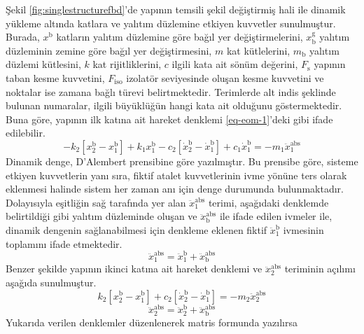 Şekil \ref{fig:singlestructurefbd}'de yapının temsili şekil değiştirmiş
hali ile dinamik yükleme altında katlara ve yalıtım düzlemine etkiyen
kuvvetler sunulmuştur. Burada, $x^{\text{b}}$ katların yalıtım düzlemine
göre bağıl yer değiştirmelerini, $x_{\text{b}}^{\text{g}}$ yalıtım
düzleminin zemine göre bağıl yer değiştirmesini, $m$ kat kütlelerini,
$m_{\text{b}}$ yalıtım düzlemi kütlesini, $k$ kat rijitliklerini,
$c$ ilgili kata ait sönüm değerini, $F_{\text{s}}$ yapının taban
kesme kuvvetini, $F_{\text{iso}}$ izolatör seviyesinde oluşan kesme
kuvvetini ve noktalar ise zamana bağlı türevi belirtmektedir. Terimlerde
alt indis şeklinde bulunan numaralar, ilgili büyüklüğün hangi kata
ait olduğunu göstermektedir. Buna göre, yapının ilk katına ait hareket
denklemi \ref{eq-eom-1}'deki gibi ifade edilebilir. 
\begin{equation}
-k_{2}\left[x_{2}^{\text{b}}-x_{1}^{\text{b}}\right]+k_{1}x_{1}^{\text{b}}-c_{2}\left[\dot{x}_{2}^{\text{b}}-\dot{x}_{1}^{\text{b}}\right]+c_{1}\dot{x}_{1}^{\text{b}}=-m_{1}\ddot{x}_{1}^{\text{abs}}\label{eq-eom-1}
\end{equation}
Dinamik denge, D'Alembert prensibine göre yazılmıştır. Bu prensibe
göre, sisteme etkiyen kuvvetlerin yanı sıra, fiktif atalet kuvvetlerinin
ivme yönüne ters olarak eklenmesi halinde sistem her zaman anı için
denge durumunda bulunmaktadır. Dolayısıyla eşitliğin sağ tarafında
yer alan $\ddot{x}_{1}^{\text{abs}}$ terimi, aşağıdaki denklemde
belirtildiği gibi yalıtım düzleminde oluşan ve $\ddot{x}_{\text{b}}^{\text{abs}}$
ile ifade edilen ivmeler ile, dinamik dengenin sağlanabilmesi için
denkleme eklenen fiktif $\ddot{x}_{1}^{\text{b}}$ ivmesinin toplamını
ifade etmektedir. 
\begin{equation}
\ddot{x}_{1}^{\text{abs}}=\ddot{x}_{1}^{\text{b}}+\ddot{x}_{\text{b}}^{\text{abs}}\label{eq-acc-1}
\end{equation}
Benzer şekilde yapının ikinci katına ait hareket denklemi ve $\ddot{x}_{2}^{\text{abs}}$
teriminin açılımı aşağıda sunulmuştur. 
\begin{equation}
k_{2}\left[x_{2}^{\text{b}}-x_{1}^{\text{b}}\right]+c_{2}\left[\dot{x}_{2}^{\text{b}}-\dot{x}_{1}^{\text{b}}\right]=-m_{2}\ddot{x}_{2}^{\text{abs}}\label{eq-eom-2}
\end{equation}
\begin{equation}
\ddot{x}_{2}^{\text{abs}}=\ddot{x}_{2}^{\text{b}}+\ddot{x}_{\text{b}}^{\text{abs}}\label{eq-acc-2}
\end{equation}
Yukarıda verilen denklemler düzenlenerek matris formunda yazılırsa
